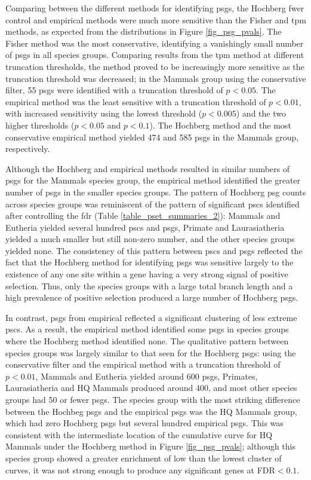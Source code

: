 Comparing between the different methods for identifying \acp{psg}, the
Hochberg \ac{fwer} control and empirical \pv methods were much
more sensitive than the Fisher and \ac{tpm} methods, as expected from
the \pv distributions in Figure \ref{fig_psg_pvals}. The Fisher
method was the most conservative, identifying a vanishingly small
number of \acp{psg} in all species groups. Comparing results from the
\ac{tpm} method at different truncation thresholds, the method proved
to be increasingly more sensitive as the truncation threshold was
decreased; in the Mammals group using the conservative filter, 55
\acp{psg} were identified with a truncation threshold of $p<0.05$. The
empirical method was the least sensitive with a truncation threshold
of $p<0.01$, with increased sensitivity using the lowest threshold
($p<0.005$) and the two higher thresholds ($p<0.05$ and $p<0.1$). The
Hochberg method and the most conservative empirical method yielded 474
and 585 \acp{psg} in the Mammals group, respectively.

Although the Hochberg and empirical methods resulted in similar
numbers of \acp{psg} for the Mammals species group, the empirical
method identified the greater number of \acp{psg} in the smaller
species groups. The pattern of Hochberg \ac{psg} counts across species
groups was reminiscent of the pattern of significant \acp{psc}
identified after controlling the \ac{fdr} (Table
\ref{table_pset_summaries_2}): Mammals and Eutheria yielded several
hundred \acp{psc} and \acp{psg}, Primate and Laurasiatheria yielded a
much smaller but still non-zero number, and the other species groups
yielded none. The consistency of this pattern between \acp{psc} and
\acp{psg} reflected the fact that the Hochberg method for identifying
\acp{psg} was sensitive largely to the existence of any one site
within a gene having a very strong signal of positive selection. Thus,
only the species groups with a large total branch length and a high
prevalence of positive selection produced a large number of Hochberg
\acp{psg}.

In contrast, \acp{psg} from empirical \pvs reflected a significant
clustering of less extreme \acp{psc}. As a result, the empirical
method identified some \acp{psg} in species groups where the Hochberg
method identified none. The qualitative pattern between species groups
was largely similar to that seen for the Hochberg \acp{psg}: using the
conservative filter and the empirical method with a truncation
threshold of $p<0.01$, Mammals and Eutheria yielded around 600
\acp{psg}, Primates, Laurasiatheria and HQ Mammals produced around
400, and most other species groups had 50 or fewer \acp{psg}. The
species group with the most striking difference between the Hochbeg
\acp{psg} and the empirical \acp{psg} was the HQ Mammals group, which
had zero Hochberg \acp{psg} but several hundred empirical
\acp{psg}. This was consistent with the intermediate location of the
cumulative curve for HQ Mammals under the Hochberg method in Figure
\ref{fig_psg_pvals}; although this species group showed a greater
enrichment of low \pvs than the lowest cluster of curves, it was
not strong enough to produce any significant genes at FDR$<0.1$.

